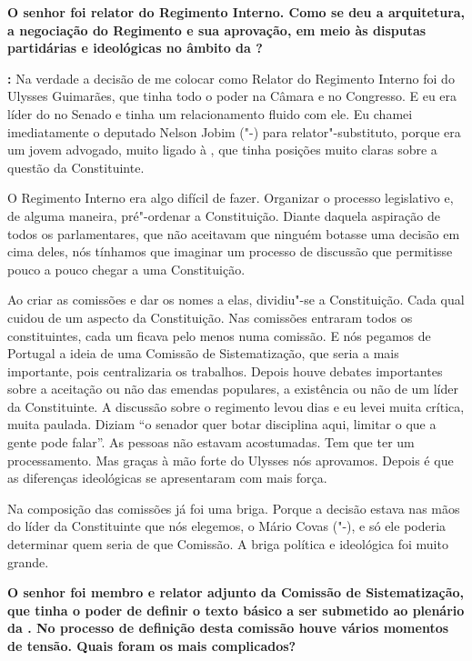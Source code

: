 \textbf{O senhor foi relator do Regimento Interno. Como se deu a
arquitetura, a negociação do Regimento e sua aprovação, em meio às
disputas partidárias e ideológicas no âmbito da ?}

\textbf{:} Na verdade a decisão de me colocar como Relator do
Regimento Interno foi do Ulysses Guimarães, que tinha todo o poder na
Câmara e no Congresso. E eu era líder do  no Senado e tinha um
relacionamento fluido com ele. Eu chamei imediatamente o deputado Nelson
Jobim ("-) para relator"-substituto, porque era um jovem advogado,
muito ligado à , que tinha posições muito claras sobre a questão da
Constituinte.

O Regimento Interno era algo difícil de fazer. Organizar o processo
legislativo e, de alguma maneira, pré"-ordenar a Constituição. Diante
daquela aspiração de todos os parlamentares, que não aceitavam que
ninguém botasse uma decisão em cima deles, nós tínhamos que imaginar um
processo de discussão que permitisse pouco a pouco chegar a uma
Constituição.

Ao criar as comissões e dar os nomes a elas, dividiu"-se a Constituição.
Cada qual cuidou de um aspecto da Constituição. Nas comissões entraram
todos os constituintes, cada um ficava pelo menos numa comissão. E nós
pegamos de Portugal a ideia de uma Comissão de Sistematização, que seria
a mais importante, pois centralizaria os trabalhos. Depois houve debates
importantes sobre a aceitação ou não das emendas populares, a existência
ou não de um líder da Constituinte. A discussão sobre o regimento levou
dias e eu levei muita crítica, muita paulada. Diziam ``o senador quer
botar disciplina aqui, limitar o que a gente pode falar''. As pessoas
não estavam acostumadas. Tem que ter um processamento. Mas graças à mão
forte do Ulysses nós aprovamos. Depois é que as diferenças ideológicas
se apresentaram com mais força.

Na composição das comissões já foi uma briga. Porque a decisão estava
nas mãos do líder da Constituinte que nós elegemos, o Mário Covas
("-), e só ele poderia determinar quem seria de que Comissão. A
briga política e ideológica foi muito grande.

\textbf{O senhor foi membro e relator adjunto da Comissão de
Sistematização, que tinha o poder de definir o texto básico a ser
submetido ao plenário da . No processo de definição desta comissão
houve vários momentos de tensão. Quais foram os mais complicados?}

